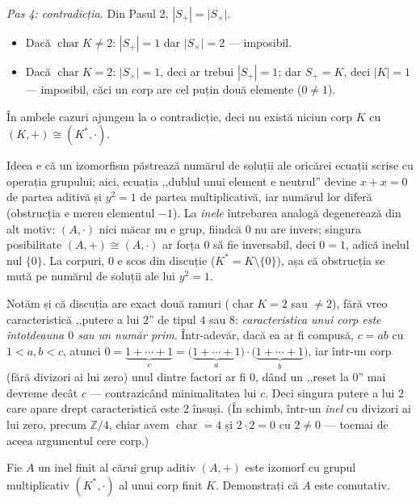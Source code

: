 \begin{solutie}
\smallskip
\textit{Pas 4: contradicția.} Din Pasul 2, $|S_{+}|=|S_{\times}|$.
\begin{itemize}[nosep,leftmargin=1.4em]
  \item Dacă $\operatorname{char}K\neq 2$: $|S_{+}|=1$ dar
        $|S_{\times}|=2$ --- imposibil.
  \item Dacă $\operatorname{char}K=2$: $|S_{\times}|=1$, deci ar trebui
        $|S_{+}|=1$; dar $S_{+}=K$, deci $|K|=1$ --- imposibil, căci un
        corp are cel puțin două elemente ($0\neq 1$).
\end{itemize}
În ambele cazuri ajungem la o contradicție, deci nu există niciun
corp $K$ cu $(K,+)\cong(K^{*},\cdot)$.
\end{solutie}

\begin{obs}
Ideea e că un izomorfism păstrează numărul de soluții ale
oricărei ecuații scrise cu operația grupului; aici, ecuația
,,dublul unui element e neutrul'' devine $x+x=0$ de partea aditivă și
$y^{2}=1$ de partea multiplicativă, iar numărul lor diferă
(obstrucția e mereu elementul $-1$). La \emph{inele} întrebarea
analogă degenerează din alt motiv: $(A,\cdot)$ nici măcar nu e
grup, fiindcă $0$ nu are invers; singura posibilitate
$(A,+)\cong(A,\cdot)$ ar forța $0$ să fie inversabil, deci $0=1$,
adică inelul nul $\{0\}$. La corpuri, $0$ e scos din discuție
($K^{*}=K\setminus\{0\}$), așa că obstrucția se mută pe
numărul de soluții ale lui $y^{2}=1$.

Notăm și că discuția are exact două ramuri
($\operatorname{char}K=2$ sau $\neq 2$), fără vreo caracteristică
,,putere a lui $2$'' de tipul $4$ sau $8$: \emph{caracteristica unui corp
este întotdeauna $0$ sau un număr prim}. Într-adevăr, dacă
ea ar fi compusă, $c=ab$ cu $1<a,b<c$, atunci
$0=\underbrace{1+\cdots+1}_{c}=\bigl(\underbrace{1+\cdots+1}_{a}\bigr)\cdot
\bigl(\underbrace{1+\cdots+1}_{b}\bigr)$, iar într-un corp (fără
divizori ai lui zero) unul dintre factori ar fi $0$, dând un ,,reset la
$0$'' mai devreme decât $c$ --- contrazicând minimalitatea lui $c$.
Deci singura putere a lui $2$ care apare drept caracteristică este $2$
însuși. (În schimb, într-un \emph{inel} cu divizori ai lui
zero, precum $\mathbb{Z}/4$, chiar avem $\operatorname{char}=4$ și
$2\cdot 2=0$ cu $2\neq 0$ --- tocmai de aceea argumentul cere corp.)
\end{obs}

\begin{problema}
Fie $A$ un inel finit al cărui grup aditiv $(A,+)$ este izomorf cu grupul
multiplicativ $(K^{*},\cdot)$ al unui corp finit $K$. Demonstrați că
$A$ este comutativ.
\end{problema}

